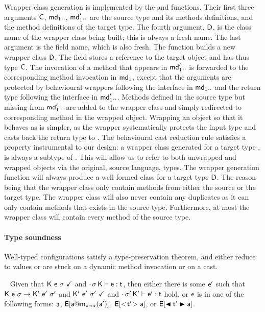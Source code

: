 \documentclass[acmlarge, anonymous, authordraft]{acmart}
\begin{document}
Wrapper class generation is implemented by the  and 
functions. Their first three arguments \({\sf{C}}\), \({\sf{md}}_1..\), \({\sf{md}}'_1..\) are
the source type and its methods definitions, and the method definitions of
the target type. The fourth argument, \({\sf{D}}\), is the class name of the
wrapper class being built; this is always a fresh name. The last argument is
the \that field name, which is also fresh.  The function builds a new
wrapper class \({\sf{D}}\).  The field \that stores a reference to the target
object and has thus type \({\sf{C}}\).  The invocation of a method that appears in
\({\sf{md}}'_{1}..\) is forwarded to the corresponding method invocation in \({\sf{md}}_{1}\), except that the arguments are protected by behavioural wrappers
following the interface in \({\sf{md}}_{1}..\) and the return type following the
interface in \({\sf{md}}'_{1}..\).  Methods defined in the source type but missing
from \({\sf{md}}'_{1}..\) are added to the wrapper class and simply redirected to
corresponding method in the wrapped object.  Wrapping an object so that it
behaves as \any is simpler, as the wrapper systematically protects the input
type and casts back the return type to \any.  The behavioural cast reduction
rule satisfies a property instrumental to our design: a wrapper class
generated for a target type \D, is always a subtype of \D.  This will allow
us to refer to both unwrapped and wrapped objects via the original, source
language, types. The wrapper generation function will always produce a
well-formed class for a target type ${\sf{D}}$. The reason being that the wrapper
class only contain methods from either the source or the target type. The
wrapper class will also never contain any duplicates as it can only contain
methods that exists in the source type.  Furthermore, at most the wrapper
class will contain every method of the source type.




\paragraph{Type soundness} 
Well-typed \kafka configurations satisfy a type-preservation theorem, and
either reduce to values or are stuck on a dynamic method invocation or on a
cast.  

\medskip{} ~
Given that ${\sf{K}}~{\sf{e}}~\sigma~\checkmark$ and $\EnvType\cdot\s\K\e\t$,
then either there is some ${{{\sf{e'}}}}$ such that ${{\sf{K}}}~{{\sf{e}}}~{\sigma} \rightarrow {{\ensuremath{{\sf{K'}}}}}~{{{{\sf{e'}}}}}~{{{\sigma'}}}$ and
${{\sf{K'}}}~{{{\sf{e'}}}}~{{\sigma'}}~\checkmark$ and $\EnvType\cdot\sp\Kp\ep\t$ hold, or ${\sf{e}}$ is in one of
the following forms: ${\sf{a}}$, $\EE[\DynCall\a\m{\ap}]$, $\EE[\SubCast\tp\a]$,
or $\EE[\BehCast\tp\a]$.
\end{document}
